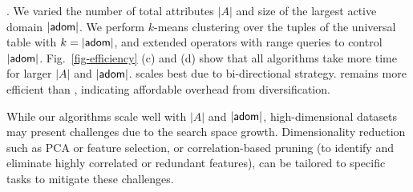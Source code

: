 

. We varied the number of total 
attributes $|A|$ and size of the largest active domain $|{\mathsf{adom}}|$. We perform $k$-means clustering over the tuples of the universal table with $k = |{\mathsf{adom}}|$, and extended operators with range queries to control $|{\mathsf{adom}}|$. %
Fig.~\ref{fig-efficiency} (c) and (d) show that all \modis algorithms take more time for larger $|A|$ and $|{\mathsf{adom}}|$. \bimodis scales best due to 
bi-directional strategy. 
\divmodis remains more efficient 
than \apxmodis, indicating affordable 
overhead from diversification.

While our algorithms scale well with $\vert A \vert$ and $\vert {\ensuremath{\mathsf{adom}}} \vert$, high-dimensional datasets may present challenges due to the search space growth. Dimensionality reduction such as PCA or feature selection, or correlation-based pruning (to identify and eliminate highly correlated or redundant features), can be tailored to specific tasks to mitigate these challenges.







